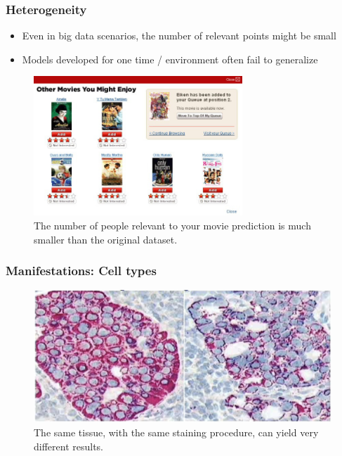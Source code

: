 \documentclass[10pt,mathserif]{beamer}
\begin{document}
\begin{frame}
  \frametitle{Heterogeneity}
  \begin{itemize}
  \item Even in big data scenarios, the number of relevant points might be small
  \item Models developed for one time / environment often fail to generalize
  \end{itemize}
 \begin{figure}[ht]
   \centering
   \includegraphics[width=0.7\textwidth]{figures/netflix_abstraction}
   \caption{The number of people relevant to your movie prediction is much
     smaller than the original dataset. \label{fig:label} }
 \end{figure}
 
\end{frame}

\begin{frame}
  \frametitle{Manifestations: Cell types}
  \begin{figure}[ht]
    \centering
    \includegraphics[options]{figures/heterogeneity}
    \caption{The same tissue, with the same staining procedure, can yield very
      different results. \label{fig:label} }
  \end{figure}
\end{frame}
\end{document}
